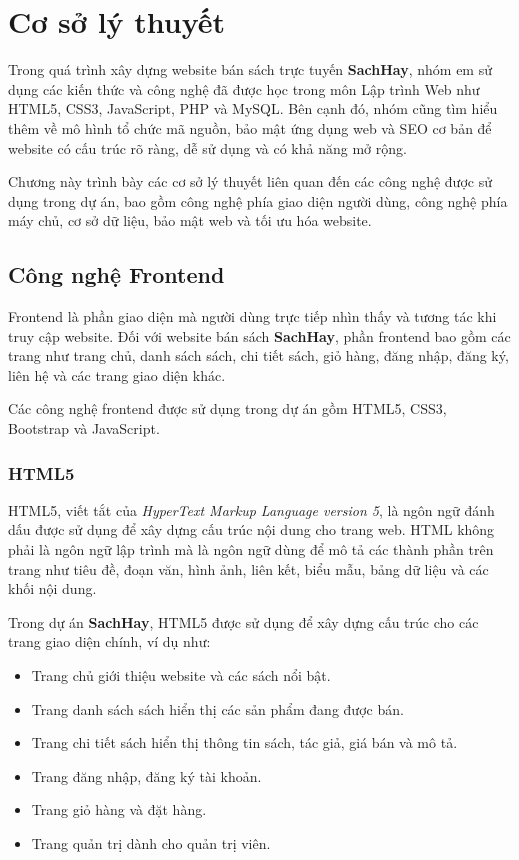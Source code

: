 
\section{Cơ sở lý thuyết}

Trong quá trình xây dựng website bán sách trực tuyến \textbf{SachHay}, nhóm em sử dụng các kiến thức và công nghệ đã được học trong môn Lập trình Web như HTML5, CSS3, JavaScript, PHP và MySQL. Bên cạnh đó, nhóm cũng tìm hiểu thêm về mô hình tổ chức mã nguồn, bảo mật ứng dụng web và SEO cơ bản để website có cấu trúc rõ ràng, dễ sử dụng và có khả năng mở rộng.

Chương này trình bày các cơ sở lý thuyết liên quan đến các công nghệ được sử dụng trong dự án, bao gồm công nghệ phía giao diện người dùng, công nghệ phía máy chủ, cơ sở dữ liệu, bảo mật web và tối ưu hóa website.

\subsection{Công nghệ Frontend}

Frontend là phần giao diện mà người dùng trực tiếp nhìn thấy và tương tác khi truy cập website. Đối với website bán sách \textbf{SachHay}, phần frontend bao gồm các trang như trang chủ, danh sách sách, chi tiết sách, giỏ hàng, đăng nhập, đăng ký, liên hệ và các trang giao diện khác.

Các công nghệ frontend được sử dụng trong dự án gồm HTML5, CSS3, Bootstrap và JavaScript.

\subsubsection{HTML5}

HTML5, viết tắt của \textit{HyperText Markup Language version 5}, là ngôn ngữ đánh dấu được sử dụng để xây dựng cấu trúc nội dung cho trang web. HTML không phải là ngôn ngữ lập trình mà là ngôn ngữ dùng để mô tả các thành phần trên trang như tiêu đề, đoạn văn, hình ảnh, liên kết, biểu mẫu, bảng dữ liệu và các khối nội dung.

Trong dự án \textbf{SachHay}, HTML5 được sử dụng để xây dựng cấu trúc cho các trang giao diện chính, ví dụ như:

\begin{itemize}
	\item Trang chủ giới thiệu website và các sách nổi bật.
	\item Trang danh sách sách hiển thị các sản phẩm đang được bán.
	\item Trang chi tiết sách hiển thị thông tin sách, tác giả, giá bán và mô tả.
	\item Trang đăng nhập, đăng ký tài khoản.
	\item Trang giỏ hàng và đặt hàng.
	\item Trang quản trị dành cho quản trị viên.
\end{itemize}

